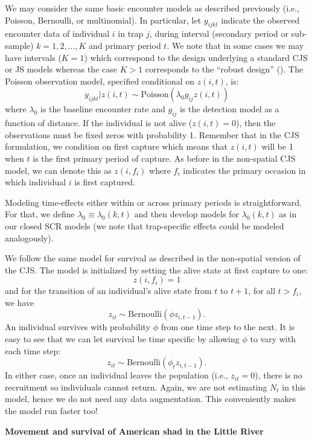 We may consider the same basic encounter
models as described previously (i.e., Poisson, Bernoulli, or
multinomial). In particular, let $y_{ijkt}$ indicate the observed
encounter data of individual $i$ in trap $j$, during interval
(secondary period or sub-sample) $k=1,2,\ldots,K$ and primary period $t$. We note that in
some cases we may have intervals ($K=1$) which correspond to the
design underlying a standard CJS or JS models whereas the case $K>1$
corresponds to the ``robust design'' (\citealt{pollock:1982}).  The
Poisson observation model, specified conditional on $z(i,t)$, is:
 \[
  y_{ijkt}|z(i,t) \sim  \mbox{Poisson}(\lambda_0 g_{ij} z(i,t))
\]
where $\lambda_{0}$ is the baseline encounter rate and $g_{ij}$ is the detection model as a function
of distance.
If the
individual is not alive ($z(i,t)=0$), then the observations must be
fixed zeros with probability 1.   Remember that in the CJS formulation, we  condition on first capture
which means that $z(i,t)$ will
be 1 when $t$ is the first primary period of capture.  As before in the non-spatial CJS model, we can denote this as $z(i, f_i)$
where $f_i$ indicates the primary occasion in which individual $i$ is first captured.

Modeling time-effects either
within or across primary periods
is straightforward. For that, we define $\lambda_{0} \equiv
\lambda_{0}(k,t)$ and then develop models for
$\lambda_{0}(k,t)$ as in our closed SCR models (we note that
trap-specific effects could be modeled analogously).

We follow the same model for survival as described in the non-spatial version of the
CJS.  The model is initialized by setting the alive
state at first capture to one:
\[
 z(i,f_i) = 1
\]
and for the transition of an individual's alive state from $t$ to $t+1$, for
all $t > f_i$, we have
\[
z_{it} \sim \mbox{Bernoulli}( \phi z_{i,t-1}).
\]
An individual survives with probability
$\phi$ from one time step to the next.  It is easy to see that we can let
survival be time specific by allowing $\phi$ to vary with each time step:
\[
 z_{it} \sim \mbox{Bernoulli}( \phi_t z_{i,t-1}).
\]
In either case, once an individual leaves the
population (i.e., $z_{it} = 0$), there is no recruitment so individuals cannot
return.  Again, we are not estimating $N_t$ in this model, hence we do not need
any data augmentation.  This conveniently makes the model run
faster too!



{\flushleft \bf Movement and survival of American shad in the Little River}


